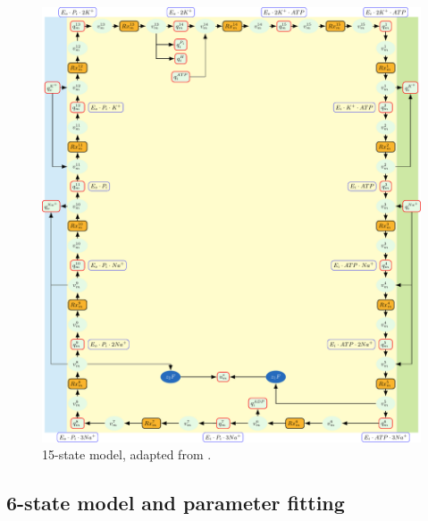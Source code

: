 \documentclass{biophys-new}
\begin{document}

\begin{figure}
\caption{15-state model, adapted from \cite{pan_cardiac_2020}.}
\centering
\includegraphics[width=1\linewidth]{15state.pdf}
\end{figure}

\subsection*{6-state model and parameter fitting}
\end{document}

